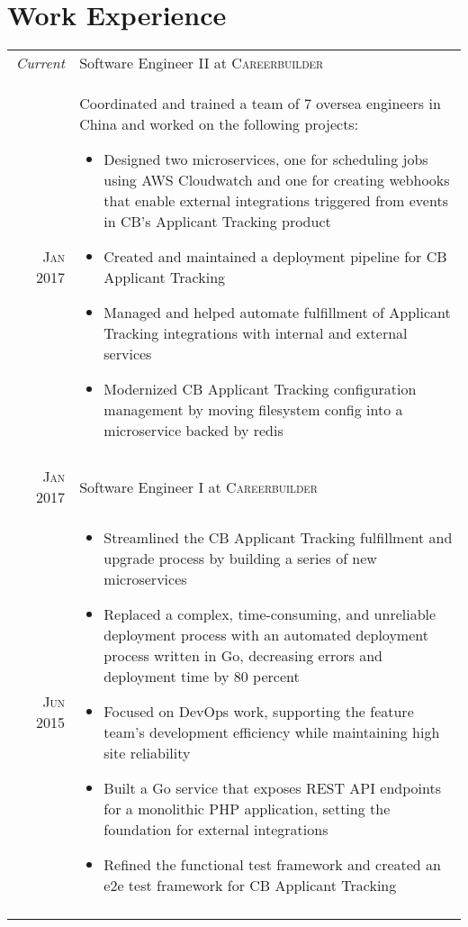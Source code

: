 \documentclass[a4paper,10pt]{article}
\begin{document}
\section{Work Experience}
\begin{tabular}{r|p{13cm}}
 \emph{Current} & Software Engineer II at \textsc{Careerbuilder} \\
 \textsc{Jan 2017} &
 \footnotesize{Coordinated and trained a team of 7 oversea engineers in China and worked on the following projects:}
 \begin{itemize}
  \item \footnotesize{Designed two microservices, one for scheduling jobs using AWS Cloudwatch and one for creating webhooks that enable external integrations triggered from events in CB's Applicant Tracking product }
  \item \footnotesize{Created and maintained a deployment pipeline for CB Applicant Tracking}
  \item \footnotesize{Managed and helped automate fulfillment of Applicant Tracking integrations with internal and external services}
  \item \footnotesize{Modernized CB Applicant Tracking configuration management by moving filesystem config into a microservice backed by redis}
 \end{itemize}
 \\
 \multicolumn{2}{c}{} \\
 \textsc{Jan 2017} & Software Engineer I at \textsc{Careerbuilder} \\
 \textsc{Jun 2015} &
 \begin{itemize}
   \item \footnotesize{Streamlined the CB Applicant Tracking fulfillment and upgrade process by building a series of new microservices}
   \item \footnotesize{Replaced a complex, time-consuming, and unreliable deployment process with an automated deployment process written in Go, decreasing errors and deployment time by 80 percent}
   \item \footnotesize{Focused on DevOps work, supporting the feature team's development efficiency while maintaining high site reliability}
   \item \footnotesize{Built a Go service that exposes REST API endpoints for a monolithic PHP application, setting the foundation for external integrations}
   \item \footnotesize{Refined the functional test framework and created an e2e test framework for CB Applicant Tracking}
 \end{itemize}
 \\
 \multicolumn{2}{c}{} \\
\end{tabular}
\end{document}
